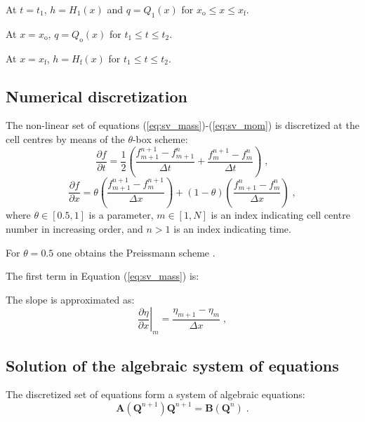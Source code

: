\documentclass{deltares_report_elv}
\newcommand{\mathsub}[2]{#1_{\mathrm{#2}}}
\begin{document}
At $t=\mathsub{t}{1}$, $h=\mathsub{H}{1}(x)$ and $q=\mathsub{Q}{1}(x)$ for $\mathsub{x}{o}\leq x \leq\mathsub{x}{f}$.

At $x=\mathsub{x}{o}$, $q=\mathsub{Q}{o}(x)$ for $\mathsub{t}{1}\leq t \leq\mathsub{t}{2}$.

At $x=\mathsub{x}{f}$, $h=\mathsub{H}{f}(x)$ for $\mathsub{t}{1}\leq t \leq\mathsub{t}{2}$.

\subsection{Numerical discretization}

The non-linear set of equations (\ref{eq:sv_mass})-(\ref{eq:sv_mom}) is discretized at the cell centres by means of the $\theta$-box scheme:
\begin{equation}
\frac{\partial f}{\partial t}=\frac{1}{2}\left(\frac{f_{m+1}^{n+1}-f_{m+1}^{n}}{\Delta t}+\frac{f_{m}^{n+1}-f_{m}^{n}}{\Delta t}\right) \;,
\end{equation}
\begin{equation}
\frac{\partial f}{\partial x}=\theta\left(\frac{f_{m+1}^{n+1}-f_{m}^{n+1}}{\Delta x}\right)+\left(1-\theta\right)\left(\frac{f_{m+1}^{n}-f_{m}^{n}}{\Delta x}\right) \;,
\end{equation}
where $\theta\in[0.5,1]$ is a parameter, $m\in[1,N]$ is an index indicating cell centre number in increasing order, and $n>1$ is an index indicating time. 

For $\theta=0.5$ one obtains the Preissmann scheme \citep{Preissmann61_2,Preissmann61_3,Lyn87_2}.


The first term in Equation (\ref{eq:sv_mass}) is:


The slope is approximated as:
\begin{equation}
\left.\frac{\partial \eta}{\partial x}\right|_{m}=\frac{\eta_{m+1}-\eta_{m}}{\Delta x} \;,
\end{equation}




\subsection{Solution of the algebraic system of equations}

The discretized set of equations form a system of algebraic equations:
\begin{equation}
\label{eq:alg}
\mathbf{A}\left(\mathbf{Q}^{n+1}\right)\mathbf{Q}^{n+1}=\mathbf{B}\left(\mathbf{Q}^{n}\right)\;.
\end{equation}
\end{document}
